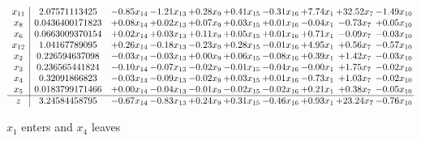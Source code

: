 \documentclass[9pt]{article}
\begin{document}
 \[\begin{array}{c| c c@{\hskip 2pt} c@{\hskip 2pt} c@{\hskip 2pt} c@{\hskip 2pt} c@{\hskip 2pt} c@{\hskip 2pt} c@{\hskip 2pt} c@{\hskip 2pt} }
 x_{11}   &  2.07571113425 & -0.85 x_{14} & -1.21 x_{13} & +  0.28 x_{9} & +  0.41 x_{15} & -0.31 x_{16} & +  7.74 x_{1} & + 32.52 x_{7} & -1.49 x_{10}\\
 x_{8}   &  0.0436400171823 & +  0.08 x_{14} & +  0.02 x_{13} & +  0.07 x_{9} & +  0.03 x_{15} & +  0.01 x_{16} & -0.04 x_{1} & -0.73 x_{7} & +  0.05 x_{10}\\
 x_{6}   &  0.0663009370154 & +  0.02 x_{14} & +  0.03 x_{13} & +  0.11 x_{9} & +  0.05 x_{15} & +  0.01 x_{16} & +  0.71 x_{1} & -0.09 x_{7} & -0.03 x_{10}\\
 x_{12}   &  1.04167789095 & +  0.26 x_{14} & -0.18 x_{13} & -0.23 x_{9} & +  0.28 x_{15} & -0.01 x_{16} & +  4.95 x_{1} & +  0.56 x_{7} & -0.57 x_{10}\\
 x_{2}   &  0.226594637098 & -0.03 x_{14} & -0.03 x_{13} & +  0.00 x_{9} & +  0.06 x_{15} & -0.08 x_{16} & +  0.39 x_{1} & +  1.42 x_{7} & -0.03 x_{10}\\
 x_{3}   &  0.236565441824 & -0.10 x_{14} & -0.07 x_{13} & -0.02 x_{9} & -0.01 x_{15} & -0.04 x_{16} & -0.00 x_{1} & +  1.75 x_{7} & -0.02 x_{10}\\
 x_{4}   &  0.32091866823 & -0.03 x_{14} & -0.09 x_{13} & -0.02 x_{9} & +  0.03 x_{15} & +  0.01 x_{16} & -0.73 x_{1} & +  1.03 x_{7} & -0.02 x_{10}\\
 x_{5}   &  0.0183799171466 & +  0.00 x_{14} & -0.04 x_{13} & -0.01 x_{9} & -0.02 x_{15} & -0.02 x_{16} & +  0.21 x_{1} & +  0.38 x_{7} & -0.05 x_{10}\\
\hline
z    &  3.24584458795 & -0.67 x_{14} & -0.83 x_{13} & +  0.24 x_{9} & +  0.31 x_{15} & -0.46 x_{16} & +  0.93 x_{1} & + 23.24 x_{7} & -0.76 x_{10}\\
\end{array}\]


 $ x_{1} $ enters and $ x_{4} $ leaves 
\end{document}

